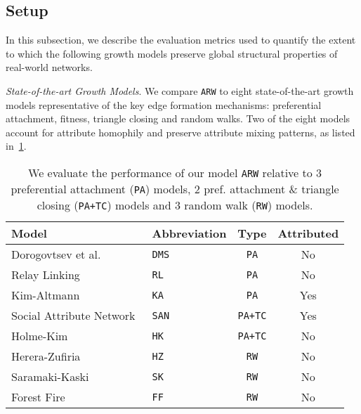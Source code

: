\vspace{-10pt}
\subsection{Setup}
\label{sub:Experimental Setup}

In this subsection, we describe the evaluation metrics used to quantify the extent to
which the following growth models preserve global structural properties of real-world networks.

\textit{State-of-the-art Growth Models}. We compare \texttt{ARW} to eight state-of-the-art
growth models representative of the key edge formation
mechanisms: preferential attachment, fitness, triangle closing and random walks.
Two of the eight models account for attribute homophily and preserve attribute mixing patterns,
as listed in~\cref{table:models}.
\begin{table}[t]
 \center
 {
  \begin{tabular}[c]{llcc} \toprule
  Model &  Abbreviation & Type & Attributed \\ \midrule
  Dorogovtsev et al.~\cite{dorogovtsev2000structure} & \texttt{DMS} & \texttt{PA} & No  \\
  Relay Linking~\cite{singh2017relay} 						  & \texttt{RL} & \texttt{PA} & No  \\
  Kim-Altmann~\cite{kim2017effect} 							  & \texttt{KA} & \texttt{PA} & Yes  \\ \midrule
  Social Attribute Network~\cite{gong2012evolution} 	  & \texttt{SAN} & \texttt{PA+TC} & Yes  \\
  Holme-Kim~\cite{holme2002growing} 						  & \texttt{HK} & \texttt{PA+TC} & No  \\ \midrule
  Herera-Zufiria~\cite{herrera2011generating} 				  & \texttt{HZ} & \texttt{RW} & No  \\
  Saramaki-Kaski~\cite{saramaki2004scale} 					  & \texttt{SK} & \texttt{RW} & No  \\
  Forest Fire~\cite{leskovec2005graphs} 					  & \texttt{FF} & \texttt{RW} & No  \\
   \bottomrule
  \end{tabular}
  \vspace{1mm}
  \caption{
  	  We evaluate the performance of our model \texttt{ARW} relative to 3 preferential attachment
	  (\texttt{PA}) models, 2 pref. attachment \& triangle closing (\texttt{PA+TC}) models and 3 random walk (\texttt{RW}) models.
  }
  \label{table:models}
 }
 \vspace{-10pt}
\end{table}

